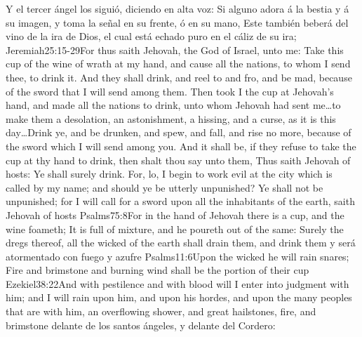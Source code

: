 Y el tercer ángel los siguió, diciendo en alta voz: Si alguno adora á la bestia y á su imagen, y toma la señal en su frente, ó en su mano, 
Este también beberá del vino de la ira de Dios, el cual está echado puro en el cáliz de su ira;%
				   {Jeremiah}{25:15-29}{For thus saith Jehovah, the God of Israel, unto me: Take this cup of the wine of wrath at my hand, and cause all the nations, to whom I send thee, to drink it. And they shall drink, and reel to and fro, and be mad, because of the sword that I will send among them. Then took I the cup at Jehovah’s hand, and made all the nations to drink, unto whom Jehovah had sent me\ldots to make them a desolation, an astonishment, a hissing, and a curse, as it is this day\ldots Drink ye, and be drunken, and spew, and fall, and rise no more, because of the sword which I will send among you. And it shall be, if they refuse to take the cup at thy hand to drink, then shalt thou say unto them, Thus saith Jehovah of hosts: Ye shall surely drink. For, lo, I begin to work evil at the city which is called by my name; and should ye be utterly unpunished? Ye shall not be unpunished; for I will call for a sword upon all the inhabitants of the earth, saith Jehovah of hosts}%
				   {Psalms}{75:8}{For in the hand of Jehovah there is a cup, and the wine foameth; It is full of mixture, and he poureth out of the same: Surely the dregs thereof, all the wicked of the earth shall drain them, and drink them}
 y será atormentado con fuego y azufre%
					{Psalms}{11:6}{Upon the wicked he will rain snares; Fire and brimstone and burning wind shall be the portion of their cup}%
					{Ezekiel}{38:22}{And with pestilence and with blood will I enter into judgment with him; and I will rain upon him, and upon his hordes, and upon the many peoples that are with him, an overflowing shower, and great hailstones, fire, and brimstone}%
 delante de los santos ángeles, y delante del Cordero: 
